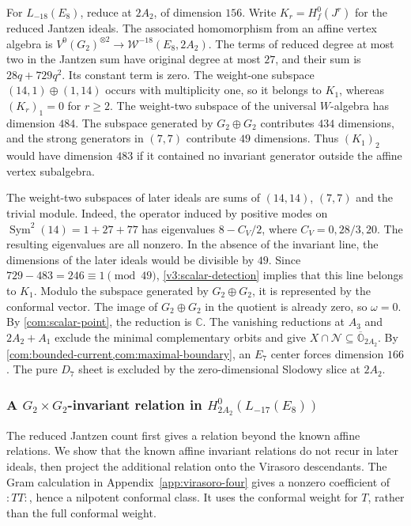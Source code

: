 \documentclass[11pt,a4paper]{amsart}
\numberwithin{equation}{section}
\theoremstyle{definition}
\theoremstyle{remark}
\newcommand{\C}{\mathbb C}
\newcommand{\N}{\mathcal N}
\newcommand{\OO}{\mathbb O}
\newcommand{\Sym}{\operatorname{Sym}}
\begin{document}
For $L_{-18}(E_8)$, reduce at $2A_2$, of dimension $156$. Write $K_r=H_f^0(J^r)$ for the reduced Jantzen
ideals. The associated
homomorphism from an affine vertex algebra is
$V^0(G_2)^{\otimes2}\to\mathcal W^{-18}(E_8,2A_2)$.
The terms of reduced degree at most two in the Jantzen sum have
original degree at most $27$, and their sum is $28q+729q^2$.
Its constant term is zero. The weight-one subspace
$(14,1)\oplus(1,14)$ occurs with multiplicity one, so it belongs to
$K_1$, whereas $(K_r)_1=0$ for $r\ge2$. The weight-two subspace of the
universal $W$-algebra has dimension $484$. The subspace generated by
$G_2\oplus G_2$ contributes $434$ dimensions, and the strong generators
in $(7,7)$ contribute $49$ dimensions. Thus $(K_1)_2$ would have
dimension $483$ if it contained no invariant generator outside the
affine vertex subalgebra.

The weight-two subspaces of later ideals are sums of $(14,14)$,
$(7,7)$ and the trivial module. Indeed, the operator induced by positive
modes on $\Sym^2(14)=1+27+77$ has eigenvalues $8-C_V/2$, where
$C_V=0,28/3,20$. The resulting eigenvalues are all nonzero. In the absence of the invariant
line, the dimensions of the later ideals would be divisible by $49$.
Since $729-483=246\equiv1\pmod {49}$, \cref{v3:scalar-detection}
implies that this line belongs to $K_1$. Modulo the subspace generated
by $G_2\oplus G_2$, it is represented by the conformal vector.
The image of $G_2\oplus G_2$ in the quotient is already zero, so
$\omega=0$. By \cref{com:scalar-point}, the reduction is $\C$.
The vanishing reductions at $A_3$ and $2A_2+A_1$ exclude the minimal
complementary orbits and give $X\cap\N\subseteq\overline{\OO}_{2A_2}$. By \cref{com:bounded-current,com:maximal-boundary}, an $E_7$
center forces dimension $166$.
The pure $D_7$ sheet is excluded by the zero-dimensional Slodowy slice at $2A_2$.

\subsubsection{\texorpdfstring{A $G_2\times G_2$-invariant relation in $H^0_{2A_2}(L_{-17}(E_8))$}{A G2 x G2 invariant relation in the 2A2 reduction of L-17(E8)}}
The reduced Jantzen count first gives a relation beyond the known affine
relations. We show that the known affine invariant relations do not recur in later ideals, then project the additional
relation onto the Virasoro descendants. The Gram calculation in
Appendix~\ref{app:virasoro-four} gives a nonzero coefficient of $:TT:$,
hence a nilpotent conformal class. It uses the conformal weight for
$T$, rather than the full conformal weight.
\end{document}

